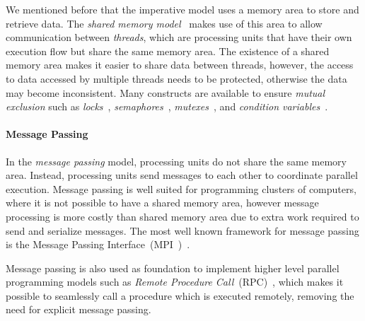 We mentioned before that the imperative model uses a memory area to store and
retrieve data. The \emph{shared memory model}~\cite{Mellor-Crummey:1991} makes
use of this area to allow communication between \emph{threads}, which are
processing units that have their own execution flow but share the same memory
area. The existence of a shared memory area makes it easier to share data
between threads, however, the access to data accessed by multiple threads needs
to be protected, otherwise the data may become inconsistent. Many constructs
are available to ensure \emph{mutual exclusion} such as
\emph{locks}~\cite{Silberschatz:2008}, \emph{semaphores}~\cite{Dijkstra:2002},
\emph{mutexes}~\cite{Silberschatz:2008}, and \emph{condition
variables}~\cite{Hoare:1974}.

\paragraph{Message Passing}

In the \emph{message passing} model, processing units do not share the same
memory area. Instead, processing units send messages to each other to coordinate
parallel execution. Message passing is well suited for programming clusters of
computers, where it is not possible to have a shared memory area, however
message processing is more costly than shared memory area due to extra work
required to send and serialize messages.  The most well known framework for
message passing is the Message Passing Interface~(MPI~)~\cite{Forum:1994}.

Message passing is also used as foundation to implement higher level parallel
programming models such as \emph{Remote Procedure
Call}~(RPC)~\cite{Birrell:1984}, which makes it possible to seamlessly call a
procedure which is executed remotely, removing the need for explicit message
passing.

